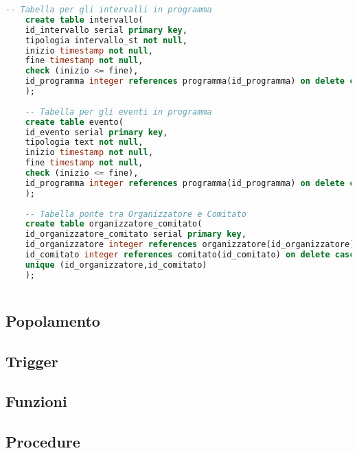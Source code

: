 \begin{lstlisting}[language=SQL, style=mystyle]
	-- Tabella per gli intervalli in programma
	create table intervallo(
	id_intervallo serial primary key,
	tipologia intervallo_st not null,
	inizio timestamp not null,
	fine timestamp not null,
	check (inizio <= fine),
	id_programma integer references programma(id_programma) on delete cascade
	);
	
	-- Tabella per gli eventi in programma
	create table evento(
	id_evento serial primary key,
	tipologia text not null,
	inizio timestamp not null,
	fine timestamp not null,
	check (inizio <= fine),
	id_programma integer references programma(id_programma) on delete cascade
	);
	
	-- Tabella ponte tra Organizzatore e Comitato
	create table organizzatore_comitato(
	id_organizzatore_comitato serial primary key,
	id_organizzatore integer references organizzatore(id_organizzatore) on delete cascade,
	id_comitato integer references comitato(id_comitato) on delete cascade,
	unique (id_organizzatore,id_comitato)
	);
	
\end{lstlisting}
\subsection{Popolamento}
\subsection{Trigger}
\subsection{Funzioni}
\subsection{Procedure}